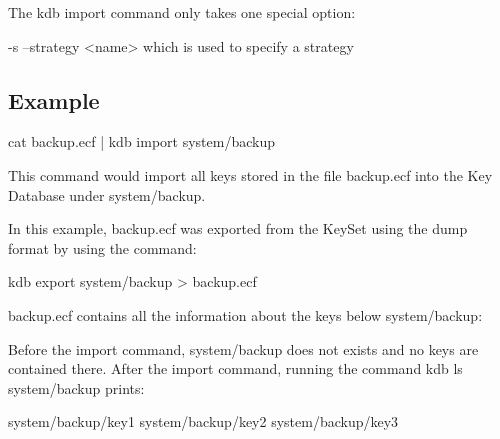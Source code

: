 The kdb import command only takes one special option\+: \begin{DoxyVerb}    -s --strategy <name>            which is used to specify a strategy
\end{DoxyVerb}


\subsection*{Example}

\begin{DoxyVerb}    cat backup.ecf | kdb import system/backup
\end{DoxyVerb}


This command would import all keys stored in the file backup.\+ecf into the Key Database under system/backup.

In this example, backup.\+ecf was exported from the Key\+Set using the dump format by using the command\+: \begin{DoxyVerb}    kdb export system/backup > backup.ecf
\end{DoxyVerb}


backup.\+ecf contains all the information about the keys below system/backup\+: 


Before the import command, system/backup does not exists and no keys are contained there. After the import command, running the command {\ttfamily kdb ls system/backup} prints\+: \begin{DoxyVerb}    system/backup/key1
    system/backup/key2
    system/backup/key3\end{DoxyVerb}
 